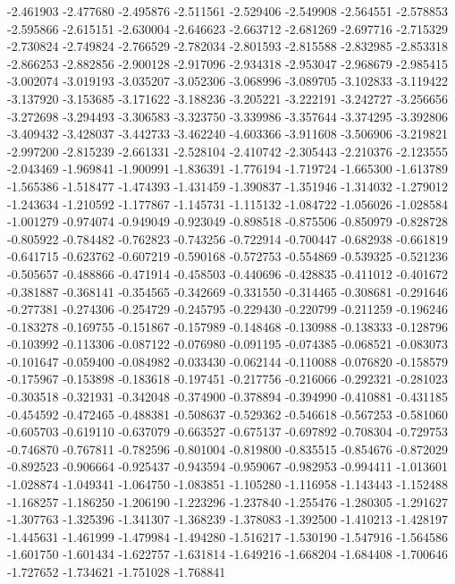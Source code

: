 -2.461903
-2.477680
-2.495876
-2.511561
-2.529406
-2.549908
-2.564551
-2.578853
-2.595866
-2.615151
-2.630004
-2.646623
-2.663712
-2.681269
-2.697716
-2.715329
-2.730824
-2.749824
-2.766529
-2.782034
-2.801593
-2.815588
-2.832985
-2.853318
-2.866253
-2.882856
-2.900128
-2.917096
-2.934318
-2.953047
-2.968679
-2.985415
-3.002074
-3.019193
-3.035207
-3.052306
-3.068996
-3.089705
-3.102833
-3.119422
-3.137920
-3.153685
-3.171622
-3.188236
-3.205221
-3.222191
-3.242727
-3.256656
-3.272698
-3.294493
-3.306583
-3.323750
-3.339986
-3.357644
-3.374295
-3.392806
-3.409432
-3.428037
-3.442733
-3.462240
-4.603366
-3.911608
-3.506906
-3.219821
-2.997200
-2.815239
-2.661331
-2.528104
-2.410742
-2.305443
-2.210376
-2.123555
-2.043469
-1.969841
-1.900991
-1.836391
-1.776194
-1.719724
-1.665300
-1.613789
-1.565386
-1.518477
-1.474393
-1.431459
-1.390837
-1.351946
-1.314032
-1.279012
-1.243634
-1.210592
-1.177867
-1.145731
-1.115132
-1.084722
-1.056026
-1.028584
-1.001279
-0.974074
-0.949049
-0.923049
-0.898518
-0.875506
-0.850979
-0.828728
-0.805922
-0.784482
-0.762823
-0.743256
-0.722914
-0.700447
-0.682938
-0.661819
-0.641715
-0.623762
-0.607219
-0.590168
-0.572753
-0.554869
-0.539325
-0.521236
-0.505657
-0.488866
-0.471914
-0.458503
-0.440696
-0.428835
-0.411012
-0.401672
-0.381887
-0.368141
-0.354565
-0.342669
-0.331550
-0.314465
-0.308681
-0.291646
-0.277381
-0.274306
-0.254729
-0.245795
-0.229430
-0.220799
-0.211259
-0.196246
-0.183278
-0.169755
-0.151867
-0.157989
-0.148468
-0.130988
-0.138333
-0.128796
-0.103992
-0.113306
-0.087122
-0.076980
-0.091195
-0.074385
-0.068521
-0.083073
-0.101647
-0.059400
-0.084982
-0.033430
-0.062144
-0.110088
-0.076820
-0.158579
-0.175967
-0.153898
-0.183618
-0.197451
-0.217756
-0.216066
-0.292321
-0.281023
-0.303518
-0.321931
-0.342048
-0.374900
-0.378894
-0.394990
-0.410881
-0.431185
-0.454592
-0.472465
-0.488381
-0.508637
-0.529362
-0.546618
-0.567253
-0.581060
-0.605703
-0.619110
-0.637079
-0.663527
-0.675137
-0.697892
-0.708304
-0.729753
-0.746870
-0.767811
-0.782596
-0.801004
-0.819800
-0.835515
-0.854676
-0.872029
-0.892523
-0.906664
-0.925437
-0.943594
-0.959067
-0.982953
-0.994411
-1.013601
-1.028874
-1.049341
-1.064750
-1.083851
-1.105280
-1.116958
-1.143443
-1.152488
-1.168257
-1.186250
-1.206190
-1.223296
-1.237840
-1.255476
-1.280305
-1.291627
-1.307763
-1.325396
-1.341307
-1.368239
-1.378083
-1.392500
-1.410213
-1.428197
-1.445631
-1.461999
-1.479984
-1.494280
-1.516217
-1.530190
-1.547916
-1.564586
-1.601750
-1.601434
-1.622757
-1.631814
-1.649216
-1.668204
-1.684408
-1.700646
-1.727652
-1.734621
-1.751028
-1.768841
